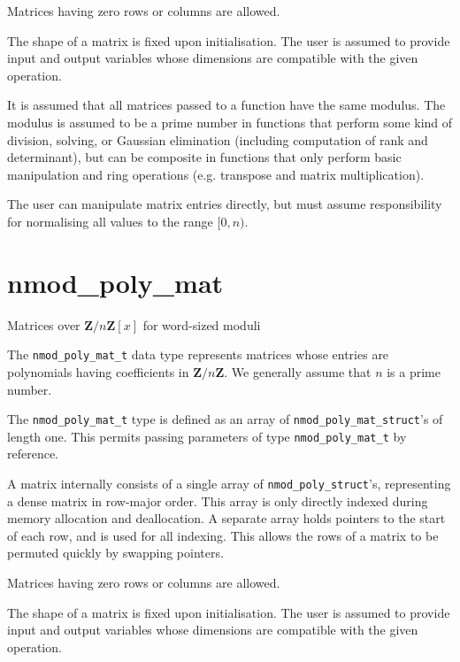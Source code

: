 \documentclass[a4paper,10pt]{book}
\newcommand{\Z}{\mathbf{Z}}%
\newcommand{\code}{\lstinline}
\begin{document}
Matrices having zero rows or columns are allowed.

The shape of a matrix is fixed upon initialisation.
The user is assumed to provide input and output variables
whose dimensions are compatible with the given operation.

It is assumed that all matrices passed to a function have the same modulus.
The modulus is assumed to be a prime number in functions that
perform some kind of division, solving, or Gaussian elimination
(including computation of rank and determinant),
but can be composite in functions that only perform basic manipulation
and ring operations (e.g. transpose and matrix multiplication).

The user can manipulate matrix entries directly, but must
assume responsibility for normalising all values to the range $[0, n)$.




\chapter{nmod\_poly\_mat}
\epigraph{Matrices over $\Z / n \Z[x]$ for word-sized moduli}{}

The \code{nmod_poly_mat_t} data type represents matrices whose
entries are polynomials having coefficients in $\Z / n \Z$.
We generally assume that $n$ is a prime number.

The \code{nmod_poly_mat_t} type is defined as an array of
\code{nmod_poly_mat_struct}'s of length one.
This permits passing parameters of type \code{nmod_poly_mat_t}
by reference.

A matrix internally consists of a single array
of \code{nmod_poly_struct}'s, representing a dense matrix in
row-major order. This array is only directly indexed
during memory allocation and deallocation. A separate array
holds pointers to the start of each row, and is used for all
indexing. This allows the rows of a matrix to be permuted
quickly by swapping pointers.

Matrices having zero rows or columns are allowed.

The shape of a matrix is fixed upon initialisation.
The user is assumed to provide input and output variables
whose dimensions are compatible with the given operation.
\end{document}
